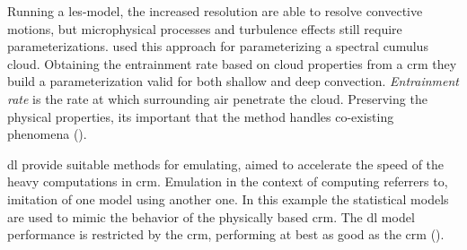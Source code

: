Running a \acrfull{les}-model, the increased resolution are able to resolve convective motions, but microphysical processes and turbulence effects still require parameterizations. \citeauthor{Baba2019SpectralModel} used this approach for parameterizing a spectral cumulus cloud. Obtaining the entrainment rate based on cloud properties from a \acrshort{crm} they build a parameterization valid for both shallow and deep convection. \textit{Entrainment rate} is the rate at which surrounding air penetrate the cloud. Preserving the physical properties, its important that the method handles co-existing phenomena (\cite{Baba2019SpectralModel}). 

\acrshort{dl} provide suitable methods for emulating, aimed to accelerate the speed of the heavy computations in \acrshort{crm}. Emulation in the context of computing referrers to, imitation of one model using another one. In this example the statistical models are used to mimic the behavior of the physically based \acrshort{crm}. The \acrshort{dl} model performance is restricted by the  \acrshort{crm}, performing at best as good as the \acrshort{crm} (\cite{Rasp2018DeepModels}).